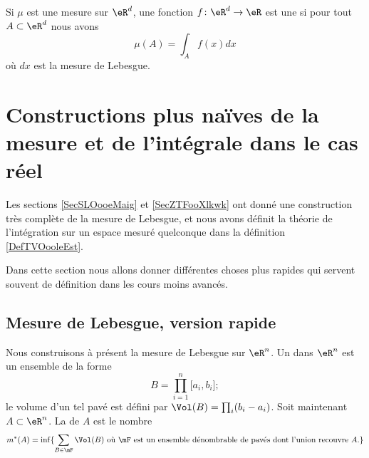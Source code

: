 Si \( \mu\) est une mesure sur \( \eR^d\), une fonction \( f\colon \eR^d\to \eR\) est une  si pour tout \( A\subset\eR^d\) nous avons
\begin{equation}
    \mu(A)=\int_Af(x)dx
\end{equation}
où \( dx\) est la mesure de Lebesgue.

\section{Constructions plus naïves de la mesure et de l'intégrale dans le cas réel}

Les sections \ref{SecSLOooeMaig} et \ref{SecZTFooXlkwk} ont donné une construction très complète de la mesure de Lebesgue, et nous avons définit la théorie de l'intégration sur un espace mesuré quelconque dans la définition \ref{DefTVOooleEst}.

Dans cette section nous allons donner différentes choses plus rapides qui servent souvent de définition dans les cours moins avancés.

\subsection{Mesure de Lebesgue, version rapide}

Nous construisons à présent la mesure de Lebesgue sur \( \eR^n\). Un  dans \( \eR^n\) est un ensemble de la forme 
\begin{equation}
    B=\prod_{i=1}^n\mathopen[ a_i , b_i \mathclose];
\end{equation}
le volume d'un tel pavé est défini par \( \Vol(B)=\prod_i(b_i-a_i)\). Soit maintenant \( A\subset \eR^n\). La  de \( A\) est le nombre
\begin{equation}
    m^*(A)=\inf\{ \sum_{B\in\mF}\Vol(B)\text{ où \( \mF\) est un ensemble dénombrable de pavés dont l'union recouvre \( A\).} \}
\end{equation}

